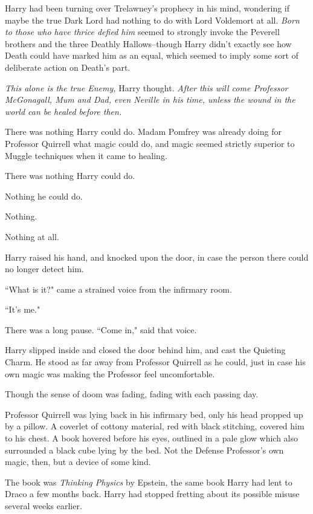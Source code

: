 Harry had been turning over Trelawney's prophecy in his mind, wondering if maybe the true Dark Lord had nothing to do with Lord Voldemort at all. \emph{Born to those who have thrice defied him} seemed to strongly invoke the Peverell brothers and the three Deathly Hallows\---though Harry didn't exactly see how Death could have marked him as an equal, which seemed to imply some sort of deliberate action on Death's part.

\emph{This alone is the true Enemy,} Harry thought. \emph{After this will come Professor McGonagall, Mum and Dad, even Neville in his time, unless the wound in the world can be healed before then.}

There was nothing Harry could do. Madam Pomfrey was already doing for Professor Quirrell what magic could do, and magic seemed strictly superior to Muggle techniques when it came to healing.

There was nothing Harry could do.

Nothing he could do.

Nothing.

Nothing at all.

\later

Harry raised his hand, and knocked upon the door, in case the person there could no longer detect him.

``What is it?" came a strained voice from the infirmary room.

``It's me."

There was a long pause. ``Come in," said that voice.

Harry slipped inside and closed the door behind him, and cast the Quieting Charm. He stood as far away from Professor Quirrell as he could, just in case his own magic was making the Professor feel uncomfortable.

Though the sense of doom was fading, fading with each passing day.

Professor Quirrell was lying back in his infirmary bed, only his head propped up by a pillow. A coverlet of cottony material, red with black stitching, covered him to his chest. A book hovered before his eyes, outlined in a pale glow which also surrounded a black cube lying by the bed. Not the Defense Professor's own magic, then, but a device of some kind.

The book was \emph{Thinking Physics} by Epstein, the same book Harry had lent to Draco a few months back. Harry had stopped fretting about its possible misuse several weeks earlier.

